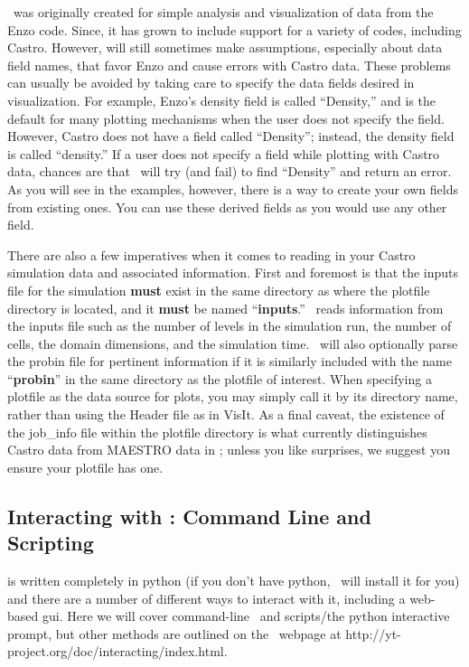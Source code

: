 \yt\ was originally created for simple analysis and visualization of
data from the Enzo code. Since, it has grown to include support for a
variety of codes, including Castro. However, \yt will still sometimes
make assumptions, especially about data field names, that favor Enzo
and cause errors with Castro data. These problems can usually be
avoided by taking care to specify the data fields desired in
visualization. For example, Enzo's density field is called
``Density,'' and is the default for many plotting mechanisms when the
user does not specify the field. However, Castro does not have a field
called ``Density''; instead, the density field is called ``density.''
If a user does not specify a field while plotting with Castro data,
chances are that \yt\ will try (and fail) to find ``Density'' and return
an error. As you will see in the examples, however, there is a way to
create your own fields from existing ones. You can use these derived
fields as you would use any other field.

There are also a few imperatives when it comes to reading in your
Castro simulation data and associated information. First and foremost
is that the inputs file for the simulation {\bf must} exist in the
same directory as where the plotfile directory is located, and it {\bf
  must} be named ``{\bf inputs}.'' \yt\ reads information from the
inputs file such as the number of levels in the simulation run, the
number of cells, the domain dimensions, and the simulation time. \yt\
will also optionally parse the probin file for pertinent information
if it is similarly included with the name ``{\bf probin}'' in the same
directory as the plotfile of interest. When specifying a plotfile as
the data source for plots, you may simply call it by its directory
name, rather than using the Header file as in VisIt. As a final
caveat, the existence of the job\_info file within the plotfile
directory is what currently distinguishes Castro data from MAESTRO
data in \yt; unless you like surprises, we suggest you ensure your
plotfile has one.

\subsection{Interacting with \yt: Command Line and Scripting}

\yt is written completely in python (if you don't have python, \yt\ will
install it for you) and there are a number of different ways to
interact with it, including a web-based gui. Here we will cover
command-line \yt\ and scripts/the python interactive prompt, but other
methods are outlined on the \yt\ webpage at
http://yt-project.org/doc/interacting/index.html.

